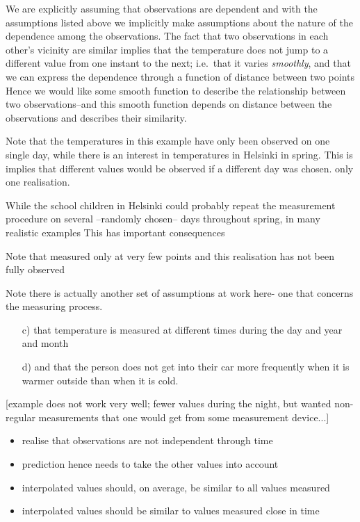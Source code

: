 We are explicitly assuming that observations are dependent and with the assumptions listed above we implicitly make assumptions about the nature of the dependence among the observations. The fact that two observations in each other's vicinity are similar implies that the temperature does not jump to a different value from one instant to the next; i.e.\ that it varies \textit{smoothly}, and that we can express the dependence through a function of distance between two points
Hence we would like some smooth function to describe the relationship between two observations--and this smooth function depends on distance between the observations and describes their similarity.



Note that the temperatures in this example have only been observed on one single day, while there is an interest in temperatures in Helsinki in spring. This is implies  that different values would be observed if a different day was chosen. 
only one realisation.


While the school children in Helsinki could probably repeat the measurement procedure on several  --randomly chosen-- days throughout spring, in many realistic examples This has important consequences 

Note that measured only at very few points
and this realisation has not been fully observed




Note there is actually another set of assumptions at work here- one that concerns the measuring process.
\begin{itemize}
\item[c)] that temperature is measured at different times during the day and year and month  
\item[d)] and that the person does not get into their car more frequently when it is warmer outside than when it is cold.
\end{itemize}
[example does not work very well; fewer values during the night, but wanted non-regular measurements that one would get from some measurement device...]



\begin{itemize}
\item realise that observations are not independent through time
\item prediction hence needs to take the other values into account 
\item interpolated values should, on average, be similar to all values measured
\item interpolated values should be similar to values measured close in time
\end{itemize}



